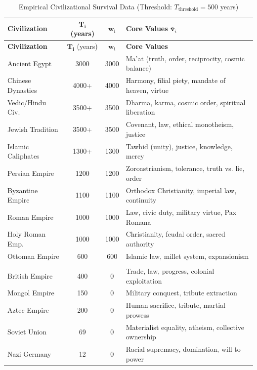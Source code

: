 \documentclass[11pt,a4paper]{article}
\theoremstyle{definition}
\theoremstyle{remark}
\begin{document}
\begin{longtable}{|l|c|c|p{5cm}|}
\caption{Empirical Civilizational Survival Data (Threshold: \(T_{\text{threshold}} = 500\) years)} \label{tab:survival_data} \\
\hline
\textbf{Civilization} & \(\mathbf{T_i}\) (years) & \(\mathbf{w_i}\) & \textbf{Core Values \(\bar{\mathbf{v}}_i\)} \\
\hline
\endfirsthead
\hline
\textbf{Civilization} & \(\mathbf{T_i}\) (years) & \(\mathbf{w_i}\) & \textbf{Core Values} \\
\hline
\endhead
\hline
\endfoot

Ancient Egypt & 3000 & 3000 & Ma'at (truth, order, reciprocity, cosmic balance) \\
\hline
Chinese Dynasties & 4000+ & 4000 & Harmony, filial piety, mandate of heaven, virtue \\
\hline
Vedic/Hindu Civ. & 3500+ & 3500 & Dharma, karma, cosmic order, spiritual liberation \\
\hline
Jewish Tradition & 3500+ & 3500 & Covenant, law, ethical monotheism, justice \\
\hline
Islamic Caliphates & 1300+ & 1300 & Tawhid (unity), justice, knowledge, mercy \\
\hline
Persian Empire & 1200 & 1200 & Zoroastrianism, tolerance, truth vs. lie, order \\
\hline
Byzantine Empire & 1100 & 1100 & Orthodox Christianity, imperial law, continuity \\
\hline
Roman Empire & 1000 & 1000 & Law, civic duty, military virtue, Pax Romana \\
\hline
Holy Roman Emp. & 1000 & 1000 & Christianity, feudal order, sacred authority \\
\hline
Ottoman Empire & 600 & 600 & Islamic law, millet system, expansionism \\
\hline
\rowcolor{gray!20}
\multicolumn{4}{|c|}{\textbf{Below Threshold (Unstable or Collapsed)}} \\
\hline
British Empire & 400 & 0 & Trade, law, progress, colonial exploitation \\
\hline
Mongol Empire & 150 & 0 & Military conquest, tribute extraction \\
\hline
Aztec Empire & 200 & 0 & Human sacrifice, tribute, martial prowess \\
\hline
Soviet Union & 69 & 0 & Materialist equality, atheism, collective ownership \\
\hline
Nazi Germany & 12 & 0 & Racial supremacy, domination, will-to-power \\
\hline
\end{longtable}
\end{document}
